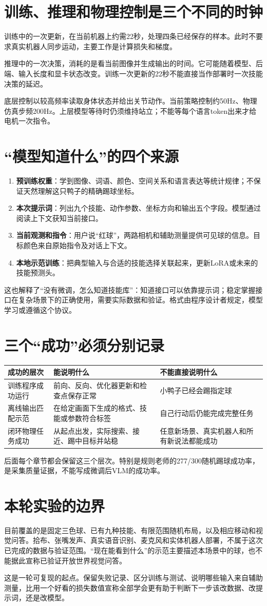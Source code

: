 \section{训练、推理和物理控制是三个不同的时钟}
训练中的一次更新，在当前机器上约需22秒，处理四条已经保存的样本。此时不要求真实机器人同步运动，主要工作是计算损失和梯度。

推理中的一次决策，消耗的是看当前图像并生成输出的时间。它可能随着模型、后端、输入长度和显卡状态改变。训练一次更新的22秒不能直接当作部署时一次技能决策的延迟。

底层控制以较高频率读取身体状态并给出关节动作。当前策略控制约50Hz、物理仿真步频200Hz。上层模型等待时仍须维持站立；不能等每个语言token出来才给电机一次指令。

\section{“模型知道什么”的四个来源}
\begin{enumerate}
\item \textbf{预训练权重}：学到图像、词语、颜色、空间关系和语言表达等统计规律；不保证天然理解这只鸭子的精确踢球坐标。
\item \textbf{本次提示词}：列出九个技能、动作参数、坐标方向和输出五个字段。模型通过阅读上下文获知当前接口。
\item \textbf{当前观测和指令}：用户说“红球”，两路相机和辅助测量提供可见球的信息。目标颜色来自原始指令及对话上下文。
\item \textbf{本地示范训练}：把典型输入与合适的技能选择关联起来，更新LoRA或未来的技能预测头。
\end{enumerate}
这也解释了“没有微调，怎么知道技能库”：知道接口可以依靠提示词；稳定掌握接口在复杂场景下的正确使用，需要实际数据和验证。格式由程序设计者规定，模型学习或遵循这个协议。

\section{三个“成功”必须分别记录}
\begin{longtable}{P{31mm}P{54mm}P{66mm}}
\toprule
成功的层次 & 能说明什么 & 不能直接说明什么\\
\midrule
\endhead
训练程序成功运行 & 前向、反向、优化器更新和检查点保存正常 & 小鸭子已经会踢指定球\\
离线输出匹配示范 & 在给定画面下生成的格式、技能或参数符合标签 & 自己行动后仍能完成完整任务\\
闭环物理任务成功 & 从起点出发，实际搜索、接近、踢中目标并站稳 & 任意新场景、真实机器人和所有新说法都能成功\\
\bottomrule
\end{longtable}
后面每个章节都会保留这三个层次。特别是规则老师的277/300随机踢球成功率，是采集质量证据，不能写成微调后VLM的成功率。

\section{本轮实验的边界}
目前覆盖的是固定三色球、已有九种技能、有限范围随机布局，以及相应移动和视觉问答。拾布、张嘴发声、真实语音识别、麦克风和实体机器人部署，不属于这次已完成的数据与验证范围。“现在能看到什么”的示范主要描述本场景中的球，也不能据此宣称已验证开放世界视觉问答。

这是一轮可复现的起点。保留失败记录、区分训练与测试、说明哪些输入来自辅助测量，比用一个好看的损失数值宣称全部学会更有助于判断下一步该改数据、改提示词，还是改模型。

